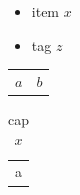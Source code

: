 \documentclass[11pt]{article}
\author{root}
\date{\today}
\title{}
\begin{document}
\tableofcontents

\begin{itemize}
\item item \(x\)
\item[{\(y\)}] tag \(z\)
\end{itemize}

\begin{center}
\begin{tabular}{ll}
\(a\) & \(b\)\\[0pt]
\end{tabular}
\end{center}

\begin{table}[htbp]
\caption{cap \(x\)}
\centering
\begin{tabular}{l}
a\\[0pt]
\end{tabular}
\end{table}
\end{document}
